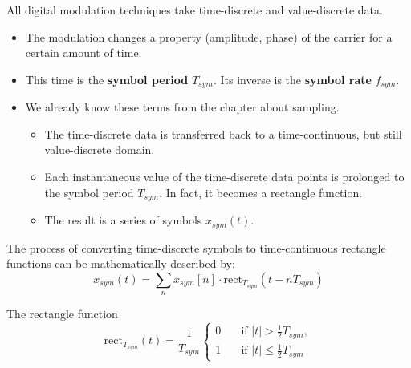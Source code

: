 \begin{refsection}
All digital modulation techniques take time-discrete and value-discrete data.
\begin{itemize}
	\item The modulation changes a property (amplitude, phase) of the carrier for a certain amount of time.
	\item This time is the  \textbf{symbol period} $T_{sym}$. Its inverse is the  \textbf{symbol rate} $f_{sym}$.
	\item We already know these terms from the chapter about sampling.
	\begin{itemize}
		\item The time-discrete data is transferred back to a time-continuous, but still value-discrete domain.
		\item Each instantaneous value of the time-discrete data points is prolonged to the symbol period $T_{sym}$. In fact, it becomes a rectangle function.
		\item The result is a series of symbols $x_{sym}(t)$.
	\end{itemize}
\end{itemize}

The process of converting time-discrete symbols to time-continuous rectangle functions can be mathematically described by:
\begin{equation}
	x_{sym}(t) = \sum\limits_{n} x_{sym}[n] \cdot \mathrm{rect}_{T_{sym}}\left(t - n T_{sym}\right)
	\label{eq:ch05:sym_rect}
\end{equation}

\begin{excursus}{The rectangle function}
	\begin{equation}
		\mathrm{rect}_{T_{sym}}\left(t\right) = \frac{1}{T_{sym}} \begin{cases}
			0 &\quad \text{if } |t| > \frac{1}{2} T_{sym}, \\
			1 &\quad \text{if } |t| \leq \frac{1}{2} T_{sym}
		\end{cases}
	\end{equation}
\end{excursus}


\end{refsection}
